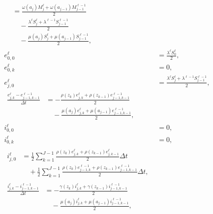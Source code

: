 \documentclass{jpmarticle}
\let\subequationsorig\subequations%
\let\endsubequationsorig\endsubequations%
\renewenvironment{subequations}{
  \subequationsorig
  \renewcommand{\theequation}{\theparentequation.\arabic{equation}}
}{
  \endsubequationsorig
}
\begin{document}
\begin{subequations}
\begin{align}
\begin{split}
      &=
      \frac{\omega(a_j) M_j^{\ell}
        + \omega(a_{j - 1}) M_{j - 1}^{\ell - 1}}
      {2}
      \\ & \quad {}
      - \frac{\lambda^{\ell} S_j^{\ell}
        + \lambda^{\ell - 1} S_{j - 1}^{\ell - 1}}
      {2}
      \\ & \quad {}
      - \frac{\mu(a_j) S_j^{\ell}
        + \mu(a_{j - 1}) S_{j - 1}^{\ell - 1}}
      {2},
    \end{split}
    \\
    e_{0, 0}^{\ell}
    &=
    \frac{\lambda^{\ell} S_0^{\ell}}
    {2},
    \\
    e_{0, k}^{\ell}
    &= 0,
    \\
    e_{j, 0}^{\ell}
    &=
    \frac{\lambda^{\ell} S_j^{\ell}
      + \lambda^{\ell - 1} S_{j - 1}^{\ell - 1}}
    {2},
    \\
    \begin{split}
      \frac{e_{j, k}^{\ell} - e_{j - 1, k - 1}^{\ell - 1}}{\Delta t}
      &=
      - \frac{\rho(z_k) e_{j, k}^{\ell}
        + \rho(z_{k - 1}) e_{j - 1, k - 1}^{\ell - 1}}
      {2}
      \\ & \quad {}
      - \frac{\mu(a_j) e_{j, k}^{\ell}
        + \mu(a_{j - 1}) e_{j - 1, k - 1}^{\ell - 1}}
      {2},
    \end{split}
    \\
    i_{0, 0}^{\ell}
    &= 0,
    \\
    i_{0, k}^{\ell}
    &= 0,
    \\
    \begin{split}
      i_{j, 0}^{\ell}
      &=
      \frac{1}{2} \sum_{k = 1}^{J - 1}
      \frac{\rho(z_k) e_{j, k}^{\ell}
        + \rho(z_{k - 1}) e_{j, k - 1}^{\ell}}
      {2}
      \Delta t
      \\ & \quad {}
      + \frac{1}{2} \sum_{k = 1}^{J - 1}
      \frac{\rho(z_k) e_{j - 1, k}^{\ell - 1}
        + \rho(z_{k - 1}) e_{j - 1, k - 1}^{\ell - 1}}
      {2}
      \Delta t,
    \end{split}
    \\
    \begin{split}
      \frac{i_{j, k}^{\ell} - i_{j - 1, k - 1}^{\ell - 1}}{\Delta t}
      &=
      - \frac{\gamma(z_k) i_{j, k}^{\ell}
        + \gamma(z_{k - 1}) i_{j - 1, k - 1}^{\ell - 1}}
      {2}
      \\ & \quad {}
      - \frac{\mu(a_j) i_{j, k}^{\ell}
        + \mu(a_{j - 1}) i_{j - 1, k - 1}^{\ell - 1}}
      {2},
    \end{split}
    \\

\end{align}
\end{subequations}
\end{document}

